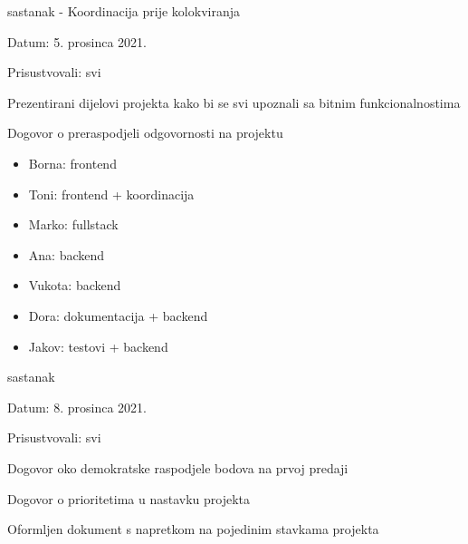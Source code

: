 \begin{packed_enum}
	        \bigskip
	        \item sastanak - Koordinacija prije kolokviranja
	        \item[] \begin{packed_item}
	           \item Datum: 5. prosinca 2021.
	           \item Prisustvovali: svi
	           \item Prezentirani dijelovi projekta kako bi se svi upoznali sa bitnim funkcionalnostima
	            \item Dogovor o preraspodjeli odgovornosti na projektu
	            \begin{itemize}
	                \item Borna: frontend
                	\item Toni: frontend + koordinacija
                	\item Marko: fullstack
            		\item Ana: backend
            		\item Vukota: backend
            		\item Dora: dokumentacija + backend
                	\item Jakov: testovi + backend
	            \end{itemize}
	        \end{packed_item}
	        
	        \bigskip
	        \item sastanak
	        \item[] \begin{packed_item}
	           \item Datum: 8. prosinca 2021.
	           \item Prisustvovali: svi
	           \item Dogovor oko demokratske raspodjele bodova na prvoj predaji
	            \item Dogovor o prioritetima u nastavku projekta
            	\item Oformljen dokument s napretkom na pojedinim stavkama projekta
	        \end{packed_item}
	        

\end{packed_enum}
